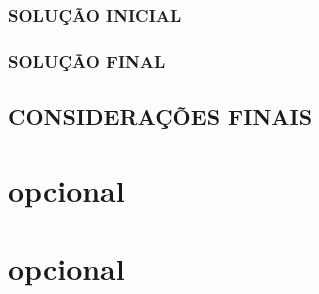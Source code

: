 \documentclass[a4paper,openright, oneside, article, 12pt, brazil]{abntex2}
\begin{document}
\subsection{SOLUÇÃO INICIAL}


\subsection{SOLUÇÃO FINAL}


\newpage
\section{CONSIDERAÇÕES FINAIS}



\newpage
\postextual

\printbibliography

\anexos

\newpage
\chapter{opcional}


\apendices

\newpage
\chapter{opcional}

\end{document}
